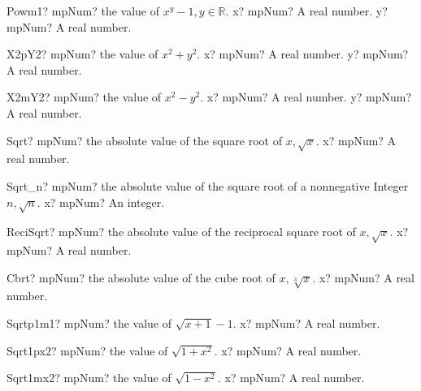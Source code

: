 \documentclass[12pt,a4paper,openany]{book}
\begin{document}
\begin{mpFunctionsExtract}
\mpFunctionTwo
{Powm1? mpNum? the value of $x^y-1, y \in  \mathbb{R}$.}
{x? mpNum? A real number.}
{y? mpNum? A real number.}
\end{mpFunctionsExtract}

\begin{mpFunctionsExtract}
\mpFunctionTwo
{X2pY2? mpNum? the value of $x^2+y^2$.}
{x? mpNum? A real number.}
{y? mpNum? A real number.}
\end{mpFunctionsExtract}

\begin{mpFunctionsExtract}
\mpFunctionTwo
{X2mY2? mpNum? the value of $x^2-y^2$.}
{x? mpNum? A real number.}
{y? mpNum? A real number.}
\end{mpFunctionsExtract}

\begin{mpFunctionsExtract}
\mpFunctionOne
{Sqrt? mpNum? the absolute value of the square root of $x, \sqrt{x}$.}
{x? mpNum? A real number.}
\end{mpFunctionsExtract}

\begin{mpFunctionsExtract}
\mpFunctionOne
{Sqrt\_n? mpNum? the absolute value of the square root of a nonnegative Integer$n, \sqrt{n}$.}
{x? mpNum? An integer.}
\end{mpFunctionsExtract}

\begin{mpFunctionsExtract}
\mpFunctionOne
{ReciSqrt? mpNum? the absolute value of the reciprocal square root of $x, \sqrt{x}$.}
{x? mpNum? A real number.}
\end{mpFunctionsExtract}

\begin{mpFunctionsExtract}
\mpFunctionOne
{Cbrt? mpNum? the absolute value of the cube root of $x, \sqrt[3]{x}$.}
{x? mpNum? A real number.}
\end{mpFunctionsExtract}

\begin{mpFunctionsExtract}
\mpFunctionOne
{Sqrtp1m1? mpNum? the value of $\sqrt{x+1}-1$.}
{x? mpNum? A real number.}
\end{mpFunctionsExtract}

\begin{mpFunctionsExtract}
\mpFunctionOne
{Sqrt1px2? mpNum? the value of $\sqrt{1+x^2}$.}
{x? mpNum? A real number.}
\end{mpFunctionsExtract}

\begin{mpFunctionsExtract}
\mpFunctionOne
{Sqrt1mx2? mpNum? the value of $\sqrt{1-x^2}$.}
{x? mpNum? A real number.}
\end{mpFunctionsExtract}
\end{document}
